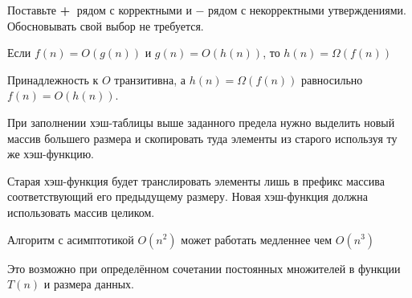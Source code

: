 \documentclass[12pt]{exam}
\begin{document}
\begin{questions}

\question[6] Поставьте {\bf \textcircled{+}} рядом с корректными и {\bf \textcircled{$-$}} рядом с некорректными утверждениями. Обосновывать свой выбор не требуется.
\begin{checkboxes}
      \CorrectChoice Если $f(n)=O(g(n))$ и $g(n)=O(h(n))$, то $h(n)=\Omega(f(n))$
      \begin{solution}
      Принадлежность к $O$ транзитивна, а $h(n)=\Omega(f(n))$ равносильно $f(n) = O(h(n))$.
      \end{solution}

    \choice При заполнении хэш-таблицы выше заданного предела нужно выделить новый массив большего размера и скопировать туда элементы из старого используя ту же хэш-функцию.
    \begin{solution}
    Старая хэш-функция будет транслировать элементы лишь в префикс массива соответствующий его предыдущему размеру. Новая хэш-функция должна использовать массив целиком.
    \end{solution}

        \CorrectChoice Алгоритм с асимптотикой $O(n^2)$ может работать медленнее чем $O(n^3)$
        \begin{solution}
        Это возможно при определённом сочетании постоянных множителей в функции $T(n)$ и размера данных.
        \end{solution}



\end{checkboxes}
\end{questions}
\end{document}
